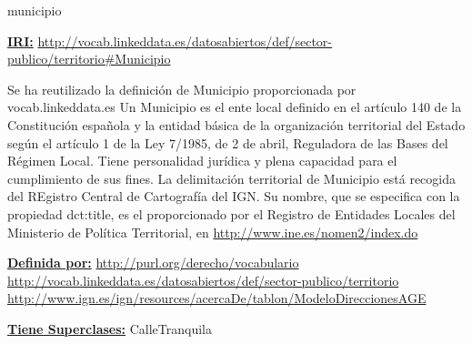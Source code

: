 \begin{mybox}{municipio}
\begin{flushleft}
\underline{\textbf{IRI:}}
\url{http://vocab.linkeddata.es/datosabiertos/def/sector-publico/territorio#Municipio}
\newline

Se ha reutilizado la definición de Municipio proporcionada por vocab.linkeddata.es \cite{datoabiertos_municipio}
Un Municipio es el ente local definido en el artículo 140 de la Constitución española y la entidad básica de la organización territorial del Estado según el artículo 1 de la Ley 7/1985, de 2 de abril, Reguladora de las Bases del Régimen Local. Tiene personalidad jurídica y plena capacidad para el cumplimiento de sus fines. La delimitación territorial de Municipio está recogida del REgistro Central de Cartografía del IGN. Su nombre, que se especifica con la propiedad dct:title, es el proporcionado por el Registro de Entidades Locales del Ministerio de Política Territorial, en \url{http://www.ine.es/nomen2/index.do}
\newline


\underline{\textbf{Definida por:}}
\url{http://purl.org/derecho/vocabulario}
\url{http://vocab.linkeddata.es/datosabiertos/def/sector-publico/territorio}
\url{http://www.ign.es/ign/resources/acercaDe/tablon/ModeloDireccionesAGE}
\newline

\underline{\textbf{Tiene Superclases:}}
\newline CalleTranquila



\end{flushleft}
\end{mybox}





